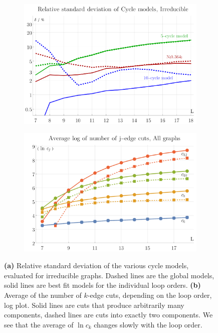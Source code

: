 \documentclass[12pt]{article}
\numberwithin{equation}{section}
\begin{document}
\begin{figure}[htb]
	\begin{subfigure}{ .49 \linewidth}
		\centering
		\includegraphics[width=\linewidth]{figures/cycle_models_relative_standard_deviation}
		\subcaption{}
		\label{fig:cycle_models_relative_standard_deviation}
	\end{subfigure}
	\begin{subfigure}{ .49 \linewidth}
		\centering
		\includegraphics[width=\linewidth]{figures/cut_averages}
		\subcaption{}
		\label{fig:cut_averages}
	\end{subfigure}
	
	
	\caption{\textbf{(a)} Relative standard deviation of the various cycle models, evaluated for irreducible graphs. Dashed lines are the global models, solid lines are best fit models for the individual loop orders. 
		\textbf{(b)}  Average of the number of $k$-edge cuts, depending on the loop order, log plot. Solid lines are cuts that produce arbitrarily many components, dashed lines are cuts into exactly two components. We see that the average of $  \ln   c_k    $ changes slowly with the loop order.
	}
	
\end{figure}
\end{document}
